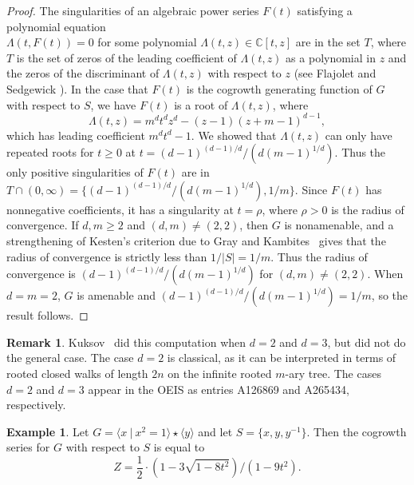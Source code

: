 \documentclass[11pt]{amsart}
\theoremstyle{definition}
\newtheorem{example}[theorem]{Example}
\newtheorem{remark}[theorem]{Remark}
\begin{document}
\begin{proof}
The singularities of an algebraic power series $F(t)$ satisfying a polynomial
equation\\ $\Lambda(t,F(t))=0$ for some polynomial $\Lambda(t,z)\in \mathbb{C}[t,z]$ are in the set $T$, where $T$ is the set of zeros of the leading coefficient of $\Lambda(t,z)$ as a polynomial in $z$ and the zeros of the discriminant of $\Lambda(t,z)$ with respect to $z$ (see Flajolet and Sedgewick \cite[\S7.36]{flajolet}). In the case that $F(t)$ is the cogrowth generating function of $G$ with respect to $S$, we have $F(t)$ is a root of $\Lambda(t,z)$, where \[\Lambda(t,z)=m^dt^{d}z^d -(z-1)(z+m-1)^{d-1},\] which has leading coefficient $m^d t^d - 1$.  We showed that $\Lambda(t,z)$ can only have repeated roots for $t\ge 0$ at 
$t=  (d-1)^{(d-1)/d}/(d(m-1)^{1/d})$.  Thus the only positive singularities of $F(t)$ are in 
$T\cap (0,\infty)= \{(d-1)^{(d-1)/d}/(d(m-1)^{1/d}),1/m\}$.  Since $F(t)$ has nonnegative coefficients, it has a singularity at $t=\rho$, where $\rho>0$ is the radius of convergence.  If $d,m\ge 2$ and $(d,m)\neq (2,2)$, then $G$ is nonamenable, and a strengthening of Kesten's criterion due to Gray and Kambites~\cite[Corollary 6.6]{Kam} gives that the radius of convergence is strictly less than $1/|S|=1/m$.  Thus the radius of convergence is $(d-1)^{(d-1)/d}/(d(m-1)^{1/d})$ for $(d,m)\neq (2,2)$. When $d=m=2$, $G$ is amenable and $(d-1)^{(d-1)/d}/(d(m-1)^{1/d})=1/m$, so the result follows.
\end{proof}
\begin{remark} Kuksov~\cite{kuksov} did this computation when $d=2$ and $d=3$, but did not do the general case.  The case $d=2$ is classical, as it can be interpreted in terms of rooted closed walks of length $2n$ on the infinite rooted $m$-ary tree.  The cases $d=2$ and $d=3$ appear in the OEIS as entries A126869 %
 and A265434, respectively.
\end{remark}
\begin{example} \label{exam:2} Let $G = \langle x~|~x^2=1\rangle \star \langle y\rangle$ and let $S=\{x,y,y^{-1}\}$.  Then the cogrowth series for $G$ with respect to $S$ is equal to $$Z=\frac{1}{2}\cdot \left(1-3\sqrt{1-8t^2}\right)/(1-9t^2).$$
\end{example}
\end{document}
